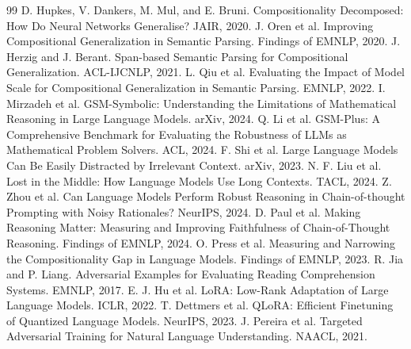 \documentclass[11pt,a4paper]{article}
\theoremstyle{plain}
\begin{document}
\begin{thebibliography}{99}
 D. Hupkes, V. Dankers, M. Mul, and E. Bruni. Compositionality Decomposed: How Do Neural Networks Generalise? JAIR, 2020.
 J. Oren et al. Improving Compositional Generalization in Semantic Parsing. Findings of EMNLP, 2020.
 J. Herzig and J. Berant. Span-based Semantic Parsing for Compositional Generalization. ACL-IJCNLP, 2021.
 L. Qiu et al. Evaluating the Impact of Model Scale for Compositional Generalization in Semantic Parsing. EMNLP, 2022.
 I. Mirzadeh et al. GSM-Symbolic: Understanding the Limitations of Mathematical Reasoning in Large Language Models. arXiv, 2024.
 Q. Li et al. GSM-Plus: A Comprehensive Benchmark for Evaluating the Robustness of LLMs as Mathematical Problem Solvers. ACL, 2024.
 F. Shi et al. Large Language Models Can Be Easily Distracted by Irrelevant Context. arXiv, 2023.
 N. F. Liu et al. Lost in the Middle: How Language Models Use Long Contexts. TACL, 2024.
 Z. Zhou et al. Can Language Models Perform Robust Reasoning in Chain-of-thought Prompting with Noisy Rationales? NeurIPS, 2024.
 D. Paul et al. Making Reasoning Matter: Measuring and Improving Faithfulness of Chain-of-Thought Reasoning. Findings of EMNLP, 2024.
 O. Press et al. Measuring and Narrowing the Compositionality Gap in Language Models. Findings of EMNLP, 2023.
 R. Jia and P. Liang. Adversarial Examples for Evaluating Reading Comprehension Systems. EMNLP, 2017.
 E. J. Hu et al. LoRA: Low-Rank Adaptation of Large Language Models. ICLR, 2022.
 T. Dettmers et al. QLoRA: Efficient Finetuning of Quantized Language Models. NeurIPS, 2023.
 J. Pereira et al. Targeted Adversarial Training for Natural Language Understanding. NAACL, 2021.
\end{thebibliography}
\end{document}
